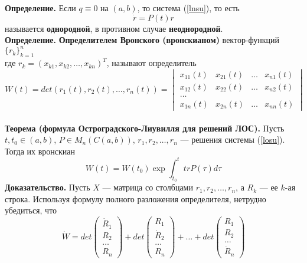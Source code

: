 \textbf{Определение.} Если $q \equiv 0$ на $(a,b)$, то система (\ref{lnsu}), то есть
\begin{equation}
    \dot{r} = P(t)r \label{losu}
\end{equation}
называется \textbf{однородной}, в противном случае \textbf{неоднородной}.\\

\noindent \textbf{Определение.} \textbf{Определителем Вронского (вронскианом)} вектор-функций $\{r_k\}_{k=1}^n$\\
где $r_k=(x_{k1}, x_{k2}, \ldots, x_{kn})^T$, называют определитель
\begin{equation*}
    W(t) = det(r_1(t),r_2(t),\ldots, r_n(t)) = \begin{vmatrix}
    x_{11}(t) & x_{21}(t) & \ldots & x_{n1}(t)\\
    x_{12}(t) & x_{22}(t) & \ldots & x_{n2}(t)\\
    \ldots\\
    x_{1n}(t) & x_{2n}(t) & \ldots & x_{nn}(t)
    \end{vmatrix}
\end{equation*}
\\
\noindent \textbf{Теорема (формула Остроградского-Лиувилля для решений ЛОС).} Пусть $t, t_0 \in (a,b)$, $P \in M_n(C(a,b))$, $r_1, r_2, \ldots, r_n$ --- решения системы (\ref{losu}). Тогда их вронскиан
\begin{equation*}
    W(t) = W(t_0)\exp \int_{t_0}^t trP(\tau)d\tau
\end{equation*}
\textbf{Доказательство.} Пусть $X$ --- матрица со столбцами $r_1, r_2, \ldots, r_n$, а $R_k$ --- ее $k$-ая строка. Используя формулу полного разложения определителя, нетрудно убедиться, что
\begin{equation*}
    \dot{W} = det\begin{pmatrix}
    \dot{R}_1\\
    R_2\\
    \ldots\\
    R_n
    \end{pmatrix} + det\begin{pmatrix}
    R_1\\
    \dot{R}_2\\
    \ldots\\
    R_n
    \end{pmatrix} + \ldots + det\begin{pmatrix}
    R_1\\
    R_2\\
    \ldots\\
    \dot{R}_n
    \end{pmatrix}
\end{equation*}

